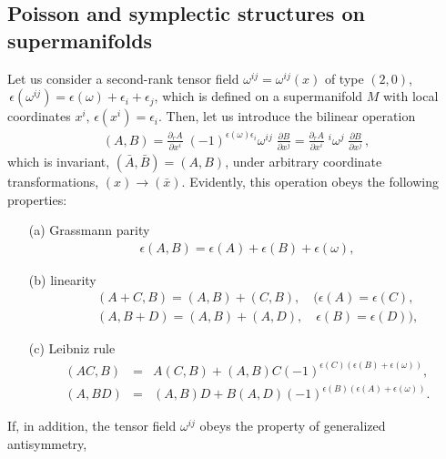 \documentclass[a4paper,11pt]{article}
\begin{document}
\begin{appendix}

\section{Poisson and symplectic structures on supermanifolds}
\renewcommand{\theequation}{\thesection.\arabic{equation}}
\setcounter{equation}{0}
\hspace*{\parindent}

Let us consider a second-rank tensor field
$\omega^{ij}=\omega^{ij}(x)$ of type $(2,0)$,
$\,\epsilon(\omega^{ij})=\epsilon(\omega)+\epsilon_i+\epsilon_j$,
which is defined on a supermanifold $M$ with local coordinates
$x^i,\, \epsilon(x^i)=\epsilon_i$. Then, let us introduce the
bilinear operation
\begin{eqnarray}
\label{A1}
(A,B)=\frac{\partial_r A}{\partial x^i}\;
(-1)^{\epsilon(\omega)\epsilon_i}\omega^{ij}\;
\frac{\partial B}{\partial x^j}=
\frac{\partial_r A}{\partial x^i}\;
 {^i\omega^j}\;
\frac{\partial B}{\partial x^j}\,,
\end{eqnarray}
which is invariant, $({\bar A},{\bar B})=(A,B)$, under arbitrary
coordinate transformations, $(x)\rightarrow ({\bar x})$.
Evidently, this operation obeys the following properties:
\begin{itemize}
\item[(a)] Grassmann parity
\begin{eqnarray}
\label{A2}
\epsilon(A,B)=\epsilon(A)+\epsilon(B)+\epsilon(\omega),
\end{eqnarray}
\item[(b)] linearity
\begin{eqnarray}
\label{A3}
&&(A+C,B)=(A,B)+(C,B),\quad (\epsilon(A)=\epsilon(C),\\
\nonumber &&(A,B+D)=(A,B)+(A,D),\quad \epsilon(B)=\epsilon(D)),
\end{eqnarray}
\item[(c)] Leibniz rule
\begin{eqnarray}
\label{A4}
\nonumber
(AC,B)&=&A(C,B)+(A,B)C(-1)^{\epsilon(C)(\epsilon(B)+\epsilon(\omega))},\\
(A,BD)&=&(A,B)D+B(A,D)(-1)^{\epsilon(B)(\epsilon(A)+\epsilon(\omega))}.
\end{eqnarray}
\end{itemize}
If, in addition, the tensor field $\omega^{ij}$ obeys the property
of generalized antisymmetry,
\begin{eqnarray}

\end{eqnarray}
\end{appendix}
\end{document}
